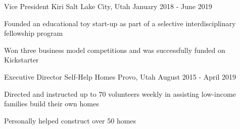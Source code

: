 

\begin{cventries}

  \cventry
    {Vice President}
    {Kiri}
    {Salt Lake City, Utah}
    {January 2018 - June 2019}
    {
      \begin{cvitems}
      	\item Founded an educational toy start-up as part of a selective interdisciplinary fellowship program
      	\item Won three business model competitions and was successfully funded on Kickstarter
      \end{cvitems}
    }
    
  \cventry
    {Executive Director} %
    {Self-Help Homes} %
    {Provo, Utah} %
    {August 2015 - April 2019} %
    {
      \begin{cvitems}
      	\item Directed and instructed up to 70 volunteers weekly in assisting low-income families build their own homes
      	\item Personally helped construct over 50 homes
      \end{cvitems}
    }
    

    


\end{cventries}
